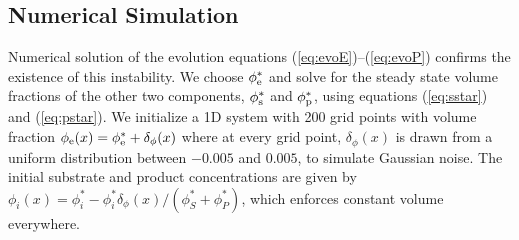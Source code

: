 \subsection{Numerical Simulation}

Numerical solution of the evolution equations (\ref{eq:evoE})--(\ref{eq:evoP}) confirms the existence of this instability. We choose $\phi_{\mathrm{e}}^*$ and solve for the steady state volume fractions of the other two components, $\phi_{\mathrm{s}}^*$ and $\phi_{\mathrm{p}}^*$, using equations (\ref{eq:sstar}) and (\ref{eq:pstar}). We initialize a 1D system with 200 grid points with volume fraction $\phi_{\mathrm{e}}(x) = \phi_{\mathrm{e}}^* + \delta_{\phi}(x)$ where at every grid point, $\delta_{\phi}(x)$ is drawn from a uniform distribution between $-0.005$ and $0.005$, to simulate Gaussian noise. The initial substrate and product concentrations are given by $\phi_i(x) = \phi_i^* - \phi_i^*\delta_{\phi}(x)/(\phi_S^*+\phi_P^*)$, which enforces constant volume everywhere.

